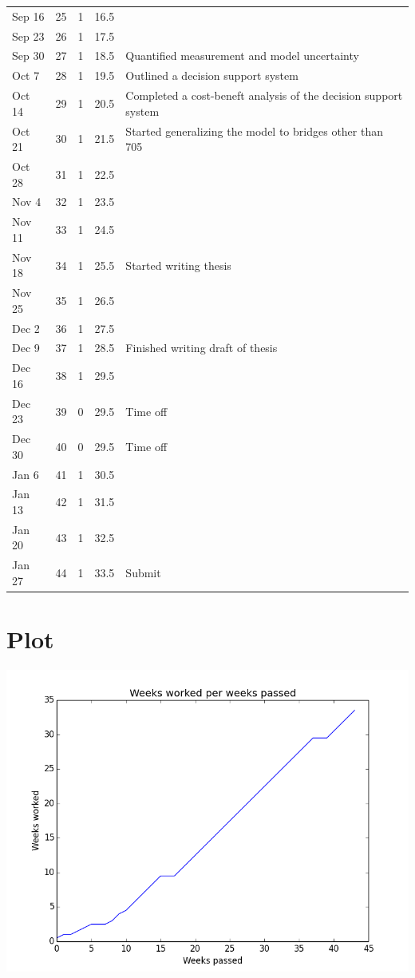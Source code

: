 \documentclass[11pt]{article}
\begin{document}
\begin{center}
\begin{tabular}{lrrrl}
Sep 16 & 25 & 1 & 16.5 & \\
Sep 23 & 26 & 1 & 17.5 & \\
Sep 30 & 27 & 1 & 18.5 & Quantified measurement and model uncertainty\\
Oct 7 & 28 & 1 & 19.5 & Outlined a decision support system\\
Oct 14 & 29 & 1 & 20.5 & Completed a cost-beneft analysis of the decision support system\\
Oct 21 & 30 & 1 & 21.5 & Started generalizing the model to bridges other than 705\\
Oct 28 & 31 & 1 & 22.5 & \\
Nov 4 & 32 & 1 & 23.5 & \\
Nov 11 & 33 & 1 & 24.5 & \\
Nov 18 & 34 & 1 & 25.5 & Started writing thesis\\
Nov 25 & 35 & 1 & 26.5 & \\
Dec 2 & 36 & 1 & 27.5 & \\
Dec 9 & 37 & 1 & 28.5 & Finished writing draft of thesis\\
Dec 16 & 38 & 1 & 29.5 & \\
Dec 23 & 39 & 0 & 29.5 & \cellcolor{blue!25} Time off\\
Dec 30 & 40 & 0 & 29.5 & \cellcolor{blue!25} Time off\\
Jan 6 & 41 & 1 & 30.5 & \\
Jan 13 & 42 & 1 & 31.5 & \\
Jan 20 & 43 & 1 & 32.5 & \\
Jan 27 & 44 & 1 & 33.5 & Submit\\
\end{tabular}
\end{center}

\section{Plot}
\label{sec:orgf4af434}
\begin{center}
\includegraphics[width=.9\linewidth]{weeks.png}
\end{center}
\end{document}

